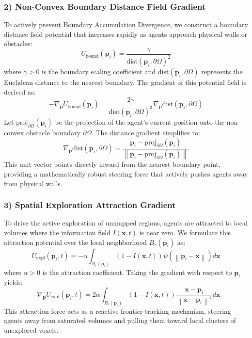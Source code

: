 \documentclass[letterpaper, 10pt, conference]{IEEEtran}
\newcommand{\norm}[1]{\left\lVert#1\right\rVert}
\begin{document}
\subsubsection{2) Non-Convex Boundary Distance Field Gradient}
To actively prevent Boundary Accumulation Divergence, we construct a boundary distance field potential that increases rapidly as agents approach physical walls or obstacles:
\begin{equation}
    U_{\text{bound}}(\mathbf{p}_i) = \frac{\gamma}{\text{dist}(\mathbf{p}_i, \partial\Omega)^2}
\end{equation}
where $\gamma > 0$ is the boundary scaling coefficient and $\text{dist}(\mathbf{p}_i, \partial\Omega)$ represents the Euclidean distance to the nearest boundary. The gradient of this potential field is derived as:
\begin{equation}
    -\nabla_{\mathbf{p}} U_{\text{bound}}(\mathbf{p}_i) = \frac{2\gamma}{\text{dist}(\mathbf{p}_i, \partial\Omega)^3} \nabla_{\mathbf{p}} \text{dist}(\mathbf{p}_i, \partial\Omega)
\end{equation}
Let $\text{proj}_{\partial\Omega}(\mathbf{p}_i)$ be the projection of the agent's current position onto the non-convex obstacle boundary $\partial\Omega$. The distance gradient simplifies to:
\begin{equation}
    \nabla_{\mathbf{p}} \text{dist}(\mathbf{p}_i, \partial\Omega) = \frac{\mathbf{p}_i - \text{proj}_{\partial\Omega}(\mathbf{p}_i)}{\norm{\mathbf{p}_i - \text{proj}_{\partial\Omega}(\mathbf{p}_i)}}
\end{equation}
This unit vector points directly inward from the nearest boundary point, providing a mathematically robust steering force that actively pushes agents away from physical walls.

\subsubsection{3) Spatial Exploration Attraction Gradient}
To drive the active exploration of unmapped regions, agents are attracted to local volumes where the information field $I(\mathbf{x}, t)$ is near zero. We formulate this attraction potential over the local neighborhood $B_r(\mathbf{p}_i)$ as:
\begin{equation}
    U_{\text{expl}}(\mathbf{p}_i, t) = -\alpha \int_{B_r(\mathbf{p}_i)} (1 - I(\mathbf{x}, t)) \psi(\norm{\mathbf{p}_i - \mathbf{x}}) d\mathbf{x}
\end{equation}
where $\alpha > 0$ is the attraction coefficient. Taking the gradient with respect to $\mathbf{p}_i$ yields:
\begin{equation}
    -\nabla_{\mathbf{p}} U_{\text{expl}}(\mathbf{p}_i, t) = 2 \alpha \int_{B_r(\mathbf{p}_i)} (1 - I(\mathbf{x}, t)) \frac{\mathbf{x} - \mathbf{p}_i}{\norm{\mathbf{x} - \mathbf{p}_i}^4} d\mathbf{x}
\end{equation}
This attraction force acts as a reactive frontier-tracking mechanism, steering agents away from saturated volumes and pulling them toward local clusters of unexplored voxels.
\end{document}
